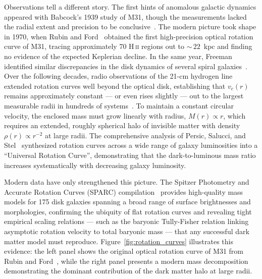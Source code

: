 Observations tell a different story.
The first hints of anomalous galactic dynamics appeared with Babcock's 1939 study of M31, though the measurements lacked the radial extent and precision to be conclusive~\cite{Babcock:1939}.
The modern picture took shape in 1970, when Rubin and Ford~\cite{Rubin:1970zza} obtained the first high-precision optical rotation curve of M31, tracing approximately 70 H\,\textsc{ii} regions out to ${\sim}\,22$~kpc and finding no evidence of the expected Keplerian decline.
In the same year, Freeman identified similar discrepancies in the disk dynamics of several spiral galaxies~\cite{Freeman:1970}.
Over the following decades, radio observations of the 21-cm hydrogen line extended rotation curves well beyond the optical disk, establishing that $v_c(r)$ remains approximately constant --- or even rises slightly --- out to the largest measurable radii in hundreds of systems~\cite{Rubin:1980zd,Bosma:1981zz}.
To maintain a constant circular velocity, the enclosed mass must grow linearly with radius, $M(r) \propto r$, which requires an extended, roughly spherical halo of invisible matter with density $\rho(r) \propto r^{-2}$ at large radii.
The comprehensive analysis of Persic, Salucci, and Stel~\cite{Persic:1995ru} synthesized rotation curves across a wide range of galaxy luminosities into a ``Universal Rotation Curve'', demonstrating that the dark-to-luminous mass ratio increases systematically with decreasing galaxy luminosity.

Modern data have only strengthened this picture.
The Spitzer Photometry and Accurate Rotation Curves (SPARC) compilation~\cite{Lelli:2016zqa} provides high-quality mass models for 175 disk galaxies spanning a broad range of surface brightnesses and morphologies, confirming the ubiquity of flat rotation curves and revealing tight empirical scaling relations --- such as the baryonic Tully-Fisher relation linking asymptotic rotation velocity to total baryonic mass --- that any successful dark matter model must reproduce.
Figure~\ref{fig:rotation_curves} illustrates this evidence: the left panel shows the original optical rotation curve of M31 from Rubin and Ford~\cite{Rubin:1970zza}, while the right panel presents a modern mass decomposition demonstrating the dominant contribution of the dark matter halo at large radii.

